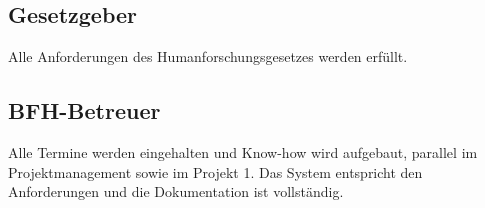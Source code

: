 \subsection{Gesetzgeber}
Alle Anforderungen des Humanforschungsgesetzes werden erfüllt.

\subsection{BFH-Betreuer}
Alle Termine werden eingehalten und Know-how wird aufgebaut, parallel im Projektmanagement sowie im Projekt 1. Das System entspricht den Anforderungen und die Dokumentation ist vollständig.
